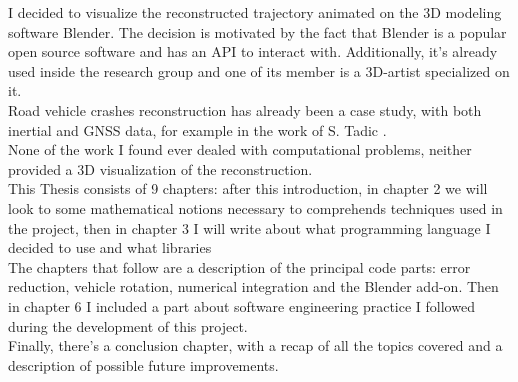 \justify
I decided to visualize the reconstructed trajectory animated on the 3D modeling software Blender. The decision is motivated by the fact that Blender is a popular open source software and has an API to interact with. Additionally, it's already used inside the research group and one of its member is a 3D-artist specialized on it.
\\
\justify
Road vehicle crashes reconstruction has already been a case study, with both inertial and GNSS data, for example in the work of S. Tadic \cite{7733120}. \\
None of the work I found ever dealed with computational problems, neither provided a 3D visualization of the reconstruction.
\\
\justify
This Thesis consists of 9 chapters: after this introduction, in chapter 2 we will look to some mathematical notions necessary to comprehends techniques used in the project, then in chapter 3 I will write about what programming language I decided to use and what libraries \\
The chapters that follow are a description of the principal code parts: error reduction, vehicle rotation, numerical integration and the Blender add-on. Then in chapter 6 I included a part about software engineering practice I followed during the development of this project. \\
Finally, there's a conclusion chapter, with a recap of all the topics covered and a description of possible future improvements.